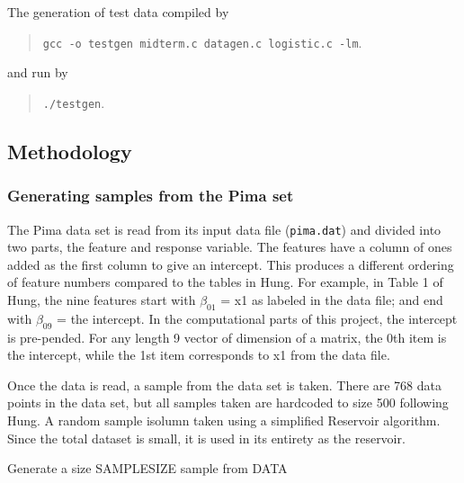 \documentclass{article}
\begin{document}
The generation of test data compiled by

\begin{quote}\verb!gcc -o testgen midterm.c datagen.c logistic.c -lm!.\end{quote}

and run by

\begin{quote}\verb!./testgen!.\end{quote}

\subsection*{Methodology}

\subsubsection*{Generating samples from the Pima set}

The Pima data set is read from its input data file (\texttt{pima.dat}) and divided into two parts, the feature and response variable. The features have a column of ones added as the first column to give an intercept. This produces a different ordering of feature numbers compared to the tables in Hung. For example, in Table 1 of Hung, the nine features start with $\beta_{01}$ = x1 as labeled in the data file; and end with $\beta_{09}$ = the intercept. In the computational parts of this project, the intercept is pre-pended. For any length 9 vector of dimension of a matrix, the 0th item is the intercept, while the 1st item corresponds to x1 from the data file. 

Once the data is read, a sample from the data set is taken. There are 768 data points in the data set, but all samples taken are hardcoded to size 500 following Hung. A random sample isolumn taken using a simplified Reservoir algorithm. Since the total dataset is small, it is used in its entirety as the reservoir.

\begin{algorithm}
\caption{Generate a size SAMPLESIZE sample from DATA}
\begin{algorithmic}
\ENDFOR
\end{algorithmic}\end{algorithm}
\end{document}
